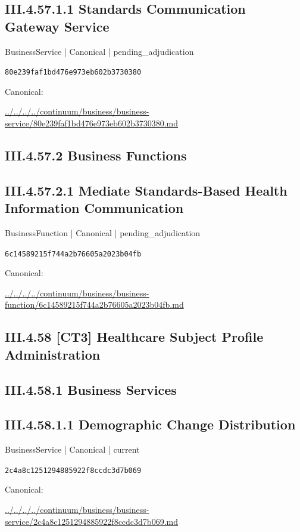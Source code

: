 \documentclass[10pt,a4paper]{article}
\begin{document}
\subsection*{III.4.57.1.1 Standards Communication Gateway Service}
{\small BusinessService | Canonical | pending\_adjudication}\par
\texttt{80e239faf1bd476e973eb602b3730380}\par
Canonical: \par
{\footnotesize\url{../../../../continuum/business/business-service/80e239faf1bd476e973eb602b3730380.md}}\par
\subsection*{III.4.57.2 Business Functions}
\subsection*{III.4.57.2.1 Mediate Standards-Based Health Information Communication}
{\small BusinessFunction | Canonical | pending\_adjudication}\par
\texttt{6c14589215f744a2b76605a2023b04fb}\par
Canonical: \par
{\footnotesize\url{../../../../continuum/business/business-function/6c14589215f744a2b76605a2023b04fb.md}}\par
\subsection*{III.4.58 [CT3] Healthcare Subject Profile Administration}
\subsection*{III.4.58.1 Business Services}
\subsection*{III.4.58.1.1 Demographic Change Distribution}
{\small BusinessService | Canonical | current}\par
\texttt{2c4a8c1251294885922f8ccdc3d7b069}\par
Canonical: \par
{\footnotesize\url{../../../../continuum/business/business-service/2c4a8c1251294885922f8ccdc3d7b069.md}}\par
\end{document}

